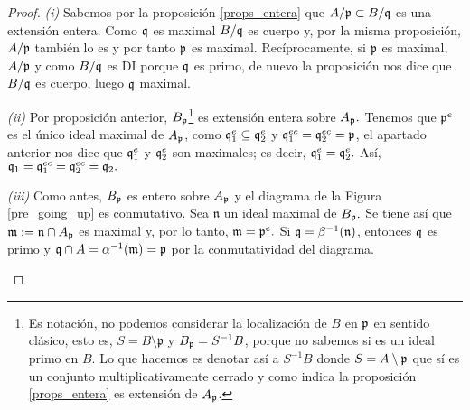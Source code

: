 \documentclass[../main.tex]{subfiles}
\begin{document}
\begin{proof}
\textit{(i)} Sabemos por la proposición \ref{props_entera} que $A/\p \subset B/\q$ es una extensión entera. Como $\q$ es maximal $B/\q$ es cuerpo y, por la misma proposición, $A/\p$ también lo es y por tanto $\p$ es maximal. Recíprocamente, si $\p$ es maximal, $A/\p$ y como $B/\q$ es DI porque $\q$ es primo, de nuevo la proposición nos dice que $B/\q$ es cuerpo, luego $\q$ maximal.

\textit{(ii)} Por proposición anterior, $B_\p$\footnote{Es notación, no podemos considerar la localización de $B$ en $\p$ en sentido clásico, esto es, $S = B \setminus \mathfrak{p}$ y $B_\p = S^{-1}B$, porque no sabemos si es un ideal primo en $B$. Lo que hacemos es denotar así a $S^{-1}B$ donde $S= A\setminus \p$ que sí es un conjunto multiplicativamente cerrado y como indica la proposición \ref{props_entera} es extensión de $A_\p$.} es extensión entera sobre $A_\p.$ Tenemos que $\p^e$ es el único ideal maximal de $A_\p$, como $\q_1^e\subseteq \q_2^e$ y $\q_1^{ec}= \q_2^{ec}=\p$, el apartado anterior nos dice que $\q_1^e$ y $\q_2^e$ son maximales; es decir, $\q_1^e=\q_2^e.$ Así, $\q_1=\q_1^{ec}=\q_2^{ec}=\q_2.$

\textit{(iii)} Como antes, $B_\p$ es entero sobre $A_\p$ y el diagrama de la Figura \ref{pre_going_up} es conmutativo. Sea $\mathfrak{n}$ un ideal maximal de $B_\p.$
Se tiene así que $\mathfrak{m}:=\mathfrak{n}\cap A_\p$ es maximal y, por lo tanto, $\mathfrak{m}=\p^e.$ Si $\q=\beta^{-1}(\mathfrak{n})$, entonces $\q$ es primo y $\q\cap A=\alpha^{-1}(\mathfrak{m})=\p$ por la conmutatividad del diagrama.

\begin{figure}
  \centering



  \begin{tikzpicture}[x=0.75pt,y=0.75pt,yscale=-1,xscale=1]



\end{tikzpicture}
\end{figure}
\end{proof}
\end{document}

